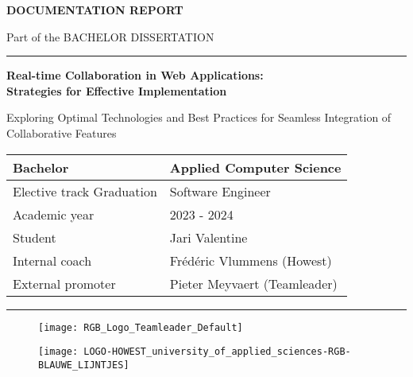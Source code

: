 \begingroup

\thispagestyle{empty}
\setlength{\parskip}{0em}

\renewcommand{\Huge}{\fontsize{22}{22}\selectfont}
\renewcommand{\huge}{\fontsize{20}{20}\selectfont}
\renewcommand{\LARGE}{\fontsize{20}{24}\selectfont}
\renewcommand{\Large}{\fontsize{18}{22}\selectfont}

\vspace*{3cm}

\Huge \textbf{\MakeUppercase{Documentation Report}}

\huge Part of the \MakeUppercase{Bachelor Dissertation}

\rule{6cm}{1pt}

\vspace{1cm}

\LARGE \textbf{Real-time Collaboration in Web Applications: \\Strategies for Effective Implementation}

\Large Exploring Optimal Technologies and Best Practices for Seamless Integration of Collaborative Features

\vfill

\normalsize
\renewcommand{\arraystretch}{1.5}
\begin{tabular}{p{}p{}}
  Bachelor                  & Applied Computer Science     \\ \hline
  Elective track Graduation & Software Engineer            \\ \hline
  Academic year             & 2023 - 2024                  \\ \hline
  Student                   & Jari Valentine               \\ \hline
  Internal coach            & Frédéric Vlummens (Howest)   \\ \hline
  External promoter         & Pieter Meyvaert (Teamleader) \\
\end{tabular}

\vspace{1cm}

\rule{\textwidth}{2pt}

\begin{figure}[b]
  \begin{minipage}[c]{0.3\textwidth}
    \texttt{[image: RGB\_Logo\_Teamleader\_Default]}
  \end{minipage}
  \hfill
  \begin{minipage}[c]{0.3\textwidth}
    \texttt{[image: LOGO-HOWEST\_university\_of\_applied\_sciences-RGB-BLAUWE\_LIJNTJES]}
  \end{minipage}
\end{figure}

\endgroup
